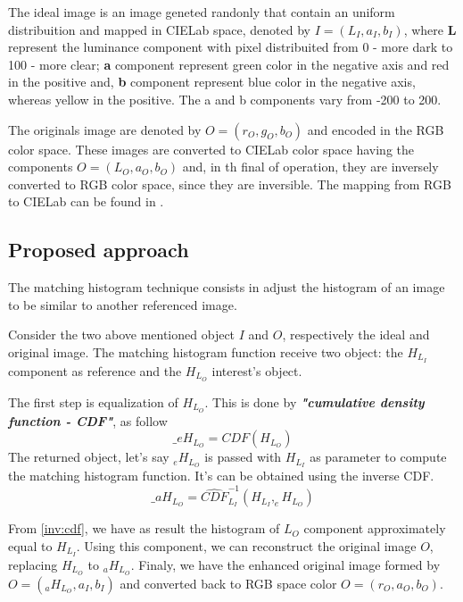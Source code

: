 \documentclass{article}
\begin{document}
The ideal image is an image geneted randonly that contain an uniform distribuition and mapped in CIELab space, denoted by $I=(L_I,a_I,b_I)$, where \textbf{L} represent the luminance component with pixel distribuited from 0 - more dark to 100 - more clear; \textbf{a} component represent green color in the negative axis and red in the positive and, \textbf{b} component represent blue color in the negative axis, whereas yellow in the positive. The a and b components vary from -200 to 200.

The originals image are denoted by $O=(r_O, g_O, b_O)$ and encoded in the RGB color space. These images are converted to CIELab color space having the components $O=(L_O, a_O, b_O)$ and, in th final of operation, they are inversely converted to RGB color space, since they are inversible. The mapping from RGB to CIELab can be found in \citep{AssessingInformationContentinColorImages}. 

\subsection{Proposed approach}
The matching histogram technique consists in adjust the histogram of an image to be similar to another referenced image.

Consider the two above mentioned object $I$ and $O$, respectively the ideal and original image. The matching histogram function receive two object: the $H_{L_I}$ component as reference and the $H_{L_O}$ interest's object. 

The first step is equalization of $H_{L_O}$. This is done by \textbf{\textit{"cumulative density function - CDF"}}, as follow
\begin{equation}
    \bm _eH_{L_O} = CDF(H_{L_O})
\end{equation}
The returned object, let's say $_eH_{L_O}$ is passed with $H_{L_I}$ as parameter to compute the matching histogram function. It's can be obtained using the inverse CDF.
\begin{equation}
    \bm _aH_{L_O} = \widehat{CDF}_{L_I}^{-1}(H_{L_I}, _eH_{L_O})
    \label{inv:cdf}
\end{equation}

From \ref{inv:cdf}, we have as result the histogram of $L_O$ component approximately equal to $H_{L_I}$. Using this component, we can reconstruct the original image $O$, replacing $H_{L_O}$ to $_aH_{L_O}$. Finaly, we have the enhanced original image formed by $O = (_aH_{L_O}, a_I, b_I)$ and converted back to RGB space color $O = (r_O, a_O, b_O)$.
\end{document}
